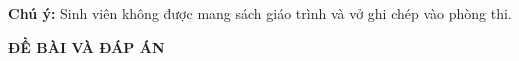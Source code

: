 \documentclass[12pt]{article}
\begin{document}
\lamtieude

\vspace*{2cm}

\indebai
{}
\begin{enumerate}[]
\foreachproblem[btdiencho]{\item\causo\thisproblem}
\end{enumerate}
\vspace*{1cm}
{\bf Chú ý:} Sinh viên không được mang sách giáo trình và vở ghi chép vào phòng thi.

\newpage
\setcounter{page}{1}
\lamtieude
\indebaidapan
\begin{center}
{\bf ĐỀ BÀI VÀ ĐÁP ÁN }
\end{center}
{}
\begin{enumerate}[]
\foreachproblem[btdiencho]{\item\causo\thisproblem}
\end{enumerate}
\end{document}
